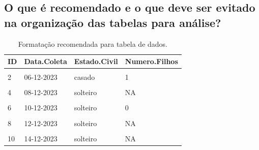 \documentclass[
  a4paper,
]{book}
\begin{document}
\hypertarget{o-que-uxe9-recomendado-e-o-que-deve-ser-evitado-na-organizauxe7uxe3o-das-tabelas-para-anuxe1lise}{%
\subsection{O que é recomendado e o que deve ser evitado na organização das tabelas para análise?}\label{o-que-uxe9-recomendado-e-o-que-deve-ser-evitado-na-organizauxe7uxe3o-das-tabelas-para-anuxe1lise}}

\begin{table}

\caption{\label{tab:tabela-recomendada}Formatação recomendada para tabela de dados.}
\centering
\begin{tabu} to 
\toprule
\textbf{ID} & \textbf{Data.Coleta} & \textbf{Estado.Civil} & \textbf{Numero.Filhos}\\
\midrule
{} &  &  & \\
2 & 06-12-2023 & casado & 1\\
 &  &  & \\
4 & 08-12-2023 & solteiro & NA\\
 &  &  & \\
6 & 10-12-2023 & solteiro & 0\\
 &  &  & \\
8 & 12-12-2023 & solteiro & NA\\
 &  &  & \\
10 & 14-12-2023 & solteiro & NA\\
\bottomrule
\end{tabu}
\end{table}
\end{document}
